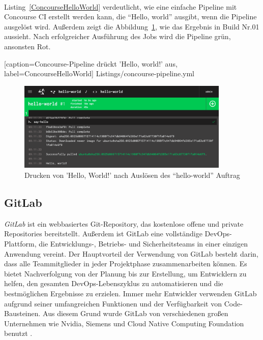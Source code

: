 \ \\
Listing~\ref{ConcourseHelloWorld} verdeutlicht, wie eine einfache Pipeline mit Concourse CI erstellt werden kann, die “Hello, world” ausgibt, wenn die Pipeline ausgelöst wird. Außerdem zeigt die Abbildung~\ref{fig:ConcourseHelloWorld}, wie das Ergebnis in Build Nr.01 aussieht. Nach erfolgreicher Ausführung des Jobs wird die Pipeline grün, ansonsten Rot.


[caption={Concourse-Pipeline drückt 'Hello, world!' aus}, label=ConcourseHelloWorld]
{Listings/concourse-pipeline.yml}

\begin{figure}[!htbp]%
	\centering
	\includegraphics[width=0.9\textwidth]{Graphics/concourse-ci-job-success.png}
	\caption{Drucken von 'Hello, World!' nach Auslösen des “hello-world” Auftrag}
	\label{fig:ConcourseHelloWorld}
\end{figure}

\subsection{GitLab}\label{sub:gitlab}

\textit{GitLab} ist ein webbasiertes Git-Repository, das kostenlose offene und private Repositories bereitstellt. 
Außerdem ist GitLab eine vollständige DevOps-Plattform, die Entwicklungs-, Betriebs- und Sicherheitsteams in einer einzigen Anwendung vereint. Der Hauptvorteil der Verwendung von GitLab besteht darin, dass alle Teammitglieder in jeder Projektphase zusammenarbeiten können. Es bietet Nachverfolgung von der Planung bis zur Erstellung, um Entwicklern zu helfen, den gesamten DevOps-Lebenszyklus zu automatisieren und die bestmöglichen Ergebnisse zu erzielen. Immer mehr Entwickler verwenden GitLab aufgrund seiner umfangreichen Funktionen und der Verfügbarkeit von Code-Bausteinen. Aus diesem Grund wurde GitLab von verschiedenen großen Unternehmen wie Nvidia, Siemens und Cloud Native Computing Foundation benutzt \cite{GitLab:about}. 

